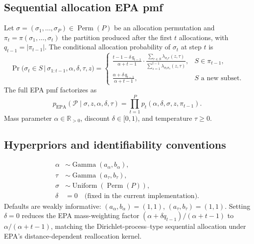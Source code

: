 \documentclass[11pt]{article}
\newcommand{\R}{\mathbb R}
\DeclareMathOperator{\GammaDist}{Gamma}
\DeclareMathOperator{\EPA}{EPA}
\DeclareMathOperator{\Perm}{Perm}
\DeclareMathOperator{\Unif}{Uniform}
\begin{document}
\subsection{Sequential allocation EPA pmf}

Let $\sigma=(\sigma_1,\dots,\sigma_P)\in\Perm(P)$ be an allocation permutation
and $\pi_t=\pi(\sigma_1,\dots,\sigma_t)$ the partition produced after the
first $t$ allocations, with $q_{t-1}=|\pi_{t-1}|$.  The conditional
allocation probability of $\sigma_t$ at step $t$ is
\begin{equation}
\Pr\!\bigl(\sigma_t\in S\,\big|\,\sigma_{1:t-1},\alpha,\delta,\tau,z\bigr)
=
\begin{cases}
\displaystyle
\frac{t-1-\delta\,q_{t-1}}{\alpha+t-1}\cdot
\frac{\sum_{r\in S}\lambda_{\sigma_t r}(z,\tau)}
     {\sum_{s=1}^{t-1}\lambda_{\sigma_t \sigma_s}(z,\tau)},
& S\in\pi_{t-1},\\[10pt]
\displaystyle\frac{\alpha+\delta\,q_{t-1}}{\alpha+t-1},
& S \text{ a new subset.}
\end{cases}
\label{eq:epa-cond}
\end{equation}
The full EPA pmf factorizes as
\begin{equation}
    p_{\EPA}(\mathcal{P}\mid\sigma,z,\alpha,\delta,\tau)
    =\prod_{t=1}^{P}p_t(\alpha,\delta,\sigma,z,\pi_{t-1}).
    \label{eq:epa-pmf}
\end{equation}
Mass parameter $\alpha\in\R_{>0}$, discount $\delta\in[0,1)$, and temperature
$\tau\geq 0$.

\subsection{Hyperpriors and identifiability conventions}

\begin{align}
    \alpha &\sim \GammaDist(a_\alpha,b_\alpha),\\
    \tau &\sim \GammaDist(a_\tau,b_\tau),\\
    \sigma &\sim \Unif(\Perm(P)),\\
    \delta &= 0\quad\text{(fixed in the current implementation).}
\end{align}
Defaults are weakly informative: $(a_\alpha,b_\alpha)=(1,1)$,
$(a_\tau,b_\tau)=(1,1)$.  Setting $\delta=0$ reduces the EPA mass-weighting
factor $(\alpha+\delta q_{t-1})/(\alpha+t-1)$ to $\alpha/(\alpha+t-1)$,
matching the Dirichlet-process--type sequential allocation under EPA's
distance-dependent reallocation kernel.
\end{document}
